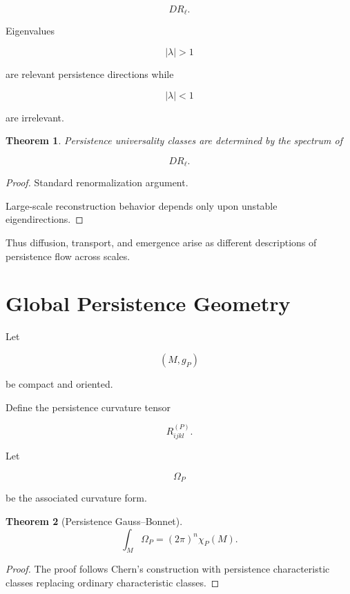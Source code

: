 \documentclass[12pt,oneside]{article}
\newtheorem{theorem}{Theorem}[section] \newtheorem{lemma}[theorem]{Lemma} \newtheorem{proposition}[theorem]{Proposition} \newtheorem{corollary}[theorem]{Corollary}
\theoremstyle{definition}
\begin{document}
\[
DR_\ell.
\]

Eigenvalues

\[
|\lambda|>1
\]

are relevant persistence directions while

\[
|\lambda|<1
\]

are irrelevant.

\begin{theorem}

Persistence universality classes are determined by the spectrum of

\[
DR_\ell.
\]

\end{theorem}

\begin{proof}

Standard renormalization argument.

Large-scale reconstruction behavior depends only upon unstable eigendirections.

\end{proof}

Thus diffusion, transport, and emergence arise as different descriptions of persistence flow across scales.

\section{Global Persistence Geometry}

Let

\[
(M,g_P)
\]

be compact and oriented.

Define the persistence curvature tensor

\[
R^{(P)}_{ijkl}.
\]

Let

\[
\Omega_P
\]

be the associated curvature form.

\begin{theorem}[Persistence Gauss--Bonnet]

\[
\int_M
\Omega_P
=
(2\pi)^n
\chi_P(M).
\]

\end{theorem}

\begin{proof}

The proof follows Chern's construction with persistence characteristic classes replacing ordinary characteristic classes.

\end{proof}
\end{document}
